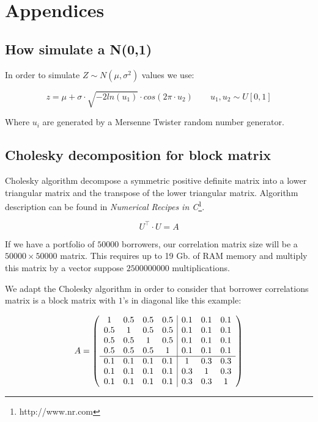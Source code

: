 \documentclass[a4paper,12pt,final]{article}
\begin{document}
\newpage
\appendix
\section{Appendices}

\subsection{How simulate a N(0,1)}
\label{ap:normsim}

In order to simulate $Z \sim N(\mu, \sigma^2)$ values we use:

\begin{displaymath}
z = \mu + \sigma\cdot \sqrt{-2 ln(u_1)} \cdot cos(2 \pi \cdot u_2)
\qquad u_1, u_2 \sim U[0,1]
\end{displaymath}

Where $u_i$ are generated by a Mersenne Twister random number generator.

\subsection{Cholesky decomposition for block matrix}
\label{ap:cholblock}

Cholesky algorithm decompose a symmetric positive definite matrix into a lower
triangular matrix and the transpose of the lower triangular matrix. Algorithm 
description can be found in \emph{Numerical Recipes in C}\footnote{http://www.nr.com}.

\begin{displaymath}
U^{\top} \cdot U = A
\end{displaymath}

If we have a portfolio of $50000$ borrowers, our correlation matrix size will
be a $50000 \times 50000$ matrix. This requires up to 19 Gb. of RAM memory and
multiply this matrix by a vector suppose $2500000000$ multiplications.
\newline

We adapt the Cholesky algorithm in order to consider that borrower correlations
matrix is a block matrix with $1$'s in diagonal like this example:

\begin{displaymath}
A = \left(
\begin{array}{cccc|ccc}
1   & 0.5 & 0.5 & 0.5 & 0.1 & 0.1 & 0.1 \cr
0.5 & 1   & 0.5 & 0.5 & 0.1 & 0.1 & 0.1 \cr
0.5 & 0.5 & 1   & 0.5 & 0.1 & 0.1 & 0.1 \cr
0.5 & 0.5 & 0.5 & 1   & 0.1 & 0.1 & 0.1 \cr
\hline
0.1 & 0.1 & 0.1 & 0.1 & 1   & 0.3 & 0.3 \cr
0.1 & 0.1 & 0.1 & 0.1 & 0.3 & 1   & 0.3 \cr
0.1 & 0.1 & 0.1 & 0.1 & 0.3 & 0.3 & 1
\end{array}
\right)
\end{displaymath}
\end{document}
